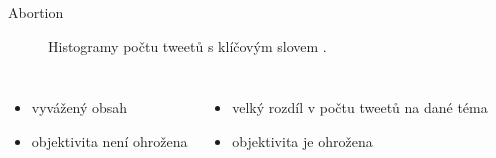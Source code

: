 \documentclass[notheorems,12pt]{beamer}
\begin{document}
\begin{frame}{Abortion}
    \begin{figure}
        \centering
        \vspace{-0.7cm}
        \caption*{Histogramy počtu tweetů s klíčovým slovem \textit{}.}
    \end{figure}
\begin{columns}
\column{6cm}
	\begin{itemize}
		\item vyvážený obsah
		\item objektivita není ohrožena
	\end{itemize}
\column{6cm}
	\begin{itemize}
		\item velký rozdíl v počtu tweetů na dané téma
		\item objektivita je ohrožena
	\end{itemize}
\end{columns}
\end{frame}
\end{document}
